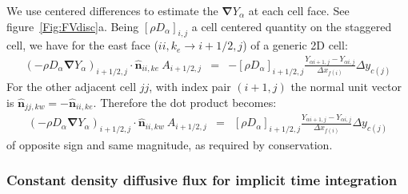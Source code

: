 \documentclass[12pt]{article}
\begin{document}
%
We use centered differences to estimate the $\boldsymbol{\nabla} Y_\alpha$ at each cell face. See figure~\ref{Fig:FVdisc}a. Being $[\rho D_\alpha]_{i,j}$ a cell centered quantity on the staggered cell, we have for the east face ($ii,k_e \rightarrow i+1/2,j$) of a generic 2D cell:
%
\begin{eqnarray}
   \left( - \rho D_\alpha \boldsymbol{\nabla} Y_\alpha \right)_{i+1/2,j} \cdot \hat{\mathbf{n}}_{ii,ke} \: A_{i+1/2,j} & = &
   -[\rho D_\alpha]_{i+1/2,j} \frac{Y_{\alpha i+1,j}-Y_{ \alpha i,j}}{\Delta x_{f(i)}} \Delta y_{c(j)} \label{eq:diffii}
\end{eqnarray}
%
For the other adjacent cell $jj$, with index pair $(i+1,j)$ the normal unit vector is $\hat{\mathbf{n}}_{jj,kw}=-\hat{\mathbf{n}}_{ii,ke}$. Therefore the dot product becomes:
%
\begin{eqnarray}
   \left( - \rho D_\alpha \boldsymbol{\nabla} Y_\alpha \right)_{i+1/2,j} \cdot \hat{\mathbf{n}}_{ii,kw} \: A_{i+1/2,j} & = &
   [\rho D_\alpha]_{i+1/2,j} \frac{Y_{\alpha i+1,j}-Y_{ \alpha i,j}}{\Delta x_{f(i)}} \Delta y_{c(j)} \label{eq:diffjj}
\end{eqnarray}
%
of opposite sign and same magnitude, as required by conservation.


\subsubsection*{Constant density diffusive flux for implicit time integration}
\end{document}

